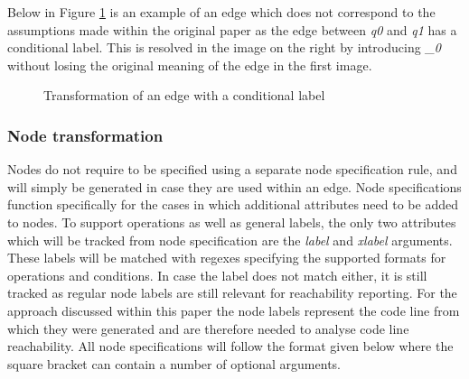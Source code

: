 \documentclass[12pt]{article}
\begin{document}
Below in Figure \ref{fig:edgetransformlabel} is an example of an edge which does not correspond to the assumptions made within the original paper as the edge between \textit{q0} and \textit{q1} has a conditional label. This is resolved in the image on the right by introducing \textit{\_0} without losing the original meaning of the edge in the first image.

\begin{figure}[h]%
	\centering
	\qquad
	\caption{Transformation of an edge with a conditional label}
	\label{fig:edgetransformlabel}
\end{figure}

\subsubsection{Node transformation}
Nodes do not require to be specified using a separate node specification rule, and will simply be generated in case they are used within an edge. Node specifications function specifically for the cases in which additional attributes need to be added to nodes. To support operations as well as general labels, the only two attributes which will be tracked from node specification are the \textit{label} and \textit{xlabel} arguments. These labels will be matched with regexes specifying the supported formats for operations and conditions. In case the label does not match either, it is still tracked as regular node labels are still relevant for reachability reporting. For the approach discussed within this paper the node labels represent the code line from which they were generated and are therefore needed to analyse code line reachability. All node specifications will follow the format given below where the square bracket can contain a number of optional arguments.
\end{document}
